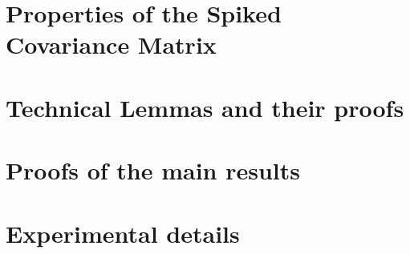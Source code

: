 \documentclass[11pt]{article}
\newcommand{\enableaddcontentsline}{%
  \let\addcontentsline\savedaddcontentsline
}
\begin{document}
\newpage
\appendix
\enableaddcontentsline
\tableofcontents
\newpage

\section{Properties of the Spiked Covariance Matrix}


\section{Technical Lemmas and their proofs}


\section{Proofs of the main results}


\section{Experimental details}

\end{document}
